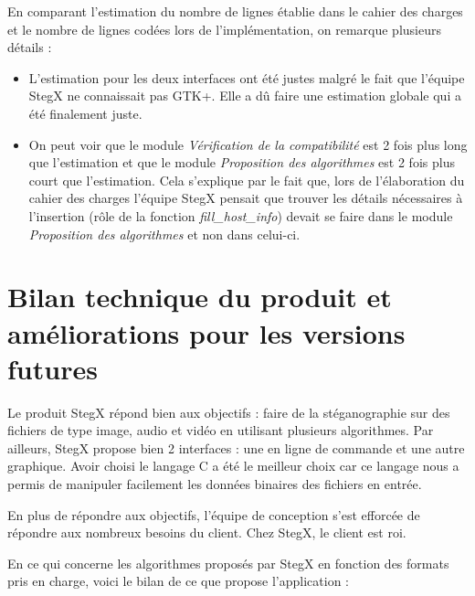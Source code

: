 \documentclass[11pt]{article}
\begin{document}
En comparant l'estimation du nombre de lignes établie dans le cahier des 
charges et le nombre de lignes codées lors de l'implémentation, on remarque 
plusieurs détails : 

\begin{itemize}
\item L'estimation pour les deux interfaces ont été justes malgré le fait 
que l'équipe StegX ne connaissait pas GTK+. Elle a dû faire une estimation 
globale qui a été finalement juste. 
\item On peut voir que le module \textit{Vérification de la compatibilité}
est 2 fois plus long que l'estimation et que le module \textit{Proposition 
des algorithmes} est 2 fois plus court que l'estimation. Cela s'explique 
par le fait que, lors de l'élaboration du cahier des charges l'équipe StegX
pensait que trouver les détails nécessaires à l'insertion (rôle de la fonction 
\textit{fill\_host\_info}) devait se faire dans le module \textit{Proposition 
des algorithmes} et non dans celui-ci.  
\end{itemize}

\section{Bilan technique du produit et améliorations pour les versions futures}

Le produit StegX répond bien aux objectifs : faire de la stéganographie sur des
fichiers de type image, audio et vidéo en utilisant plusieurs algorithmes. Par
ailleurs, StegX propose bien 2 interfaces : une en ligne de commande et une
autre graphique. Avoir choisi le langage C a été le meilleur choix car ce
langage nous a permis de manipuler facilement les données binaires des fichiers
en entrée. 

En plus de répondre aux objectifs, l'équipe de conception s'est efforcée 
de répondre aux nombreux besoins du client. Chez StegX, le client est roi.

En ce qui concerne les algorithmes proposés par StegX en fonction des 
formats pris en charge, voici le bilan de ce que propose l'application : 
\newline
\end{document}
